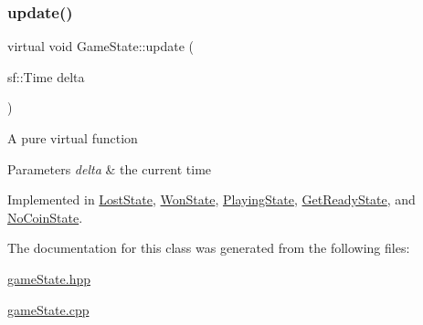 \mbox{\label{class_game_state_ab1fe4312f7ce88e7dc11f9935dee67d1}} 
\subsubsection{\texorpdfstring{update()}{update()}}
{\footnotesize\ttfamily virtual void Game\+State\+::update (\begin{DoxyParamCaption}\item[{sf\+::\+Time}]{delta }\end{DoxyParamCaption})\hspace{0.3cm}{\ttfamily [pure virtual]}}

A pure virtual function


\begin{DoxyParams}{Parameters}
{\em delta} & the current time \\
\hline
\end{DoxyParams}


Implemented in \hyperlink{class_lost_state_a16d5e12284d03f8dd6b25a897b25839b}{Lost\+State}, \hyperlink{class_won_state_a0ea91513e3df2eafbe8ef7b9810eaff1}{Won\+State}, \hyperlink{class_playing_state_a62b3904b8a971fed2f8fab4eb73bd9e5}{Playing\+State}, \hyperlink{class_get_ready_state_a6e5a1035b4ee7a52aa28027a0b99dd8a}{Get\+Ready\+State}, and \hyperlink{class_no_coin_state_af0194851310c6df176770713341a8b80}{No\+Coin\+State}.



The documentation for this class was generated from the following files\+:\begin{DoxyCompactItemize}
\item 
\hyperlink{game_state_8hpp}{game\+State.\+hpp}\item 
\hyperlink{game_state_8cpp}{game\+State.\+cpp}\end{DoxyCompactItemize}
